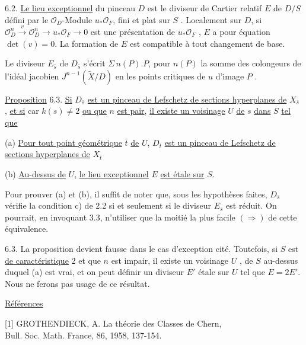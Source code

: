 
6.2. \underline{Le lieu exceptionnel} du pinceau $D$ est le diviseur de Cartier relatif $E$ de $D/S$ défini par le $\mathcal{O}_D$-Module $u_*\mathcal{O}_F$, fini et plat sur $S$ . Localement sur $D$, si $\mathcal{O}_D^n \xrightarrow{\ v\ } \mathcal{O}_D^n \longrightarrow u_*\mathcal{O}_F \longrightarrow 0$ est une présentation de $u_*\mathcal{O}_F$ , $E$ a pour équation $\det(v) = 0$. La formation de $E$ est compatible à tout changement de base.

Le diviseur $E_{\bar{s}}$ de $D_{\bar{s}}$ s'écrit $\Sigma\, n(P).P$, pour $n(P)$ la somme des colongeurs de l'idéal jacobien $J^{n-1}(\widetilde{X}/D)$ en les points critiques de $u$ d'image $P$ .

\underline{Proposition} 6.3. \underline{Si} $D_{\bar{s}}$ \underline{est un pinceau de Lefschetz de sections hyperplanes de} $X_{\bar{s}}$ , \underline{et si} car $k(s) \neq 2$ \underline{ou que} $n$ \underline{est pair}, \underline{il existe un voisinage} $U$ \underline{de} $s$ \underline{dans} $S$ \underline{tel que}

(a) \underline{Pour tout point géométrique} $\bar{t}$ \underline{de} $U$, $D_{\bar{t}}$ \underline{est un pinceau de Lefschetz de sections hyperplanes de} $X_{\bar{t}}$

(b) \underline{Au-dessus de} $U$, \underline{le lieu exceptionnel} $E$ \underline{est étale sur} $S$.

Pour prouver (a) et (b), il suffit de noter que, sous les hypothèses faites, $D_{\bar{s}}$ vérifie la condition c) de 2.2 si et seulement si le diviseur $E_{\bar{s}}$ est réduit. On pourrait, en invoquant 3.3, n'utiliser que la moitié la plus facile $(\Longrightarrow)$ de cette équivalence.

6.3. La proposition devient fausse dans le cas d'exception cité. Toutefois, si $S$ est \underline{de caractéristique} 2 et que $n$ est impair, il existe un voisinage $U$ , de $S$ au-dessus duquel (a) est vrai, et on peut définir un diviseur $E'$ étale sur $U$ tel que $E = 2 E'$. Nous ne ferons pas usage de ce résultat.


\underline{Références}

[1] GROTHENDIECK, A. \quad La théorie des Classes de Chern, \\ \hspace*{5.5em} Bull. Soc. Math. France, 86, 1958, 137-154.
